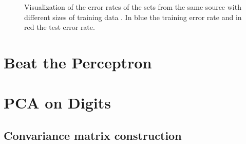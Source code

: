 \documentclass[12pt]{article}
\begin{document}
\begin{figure}[h!]
	\centering
	\hfill
	\hfill
	\hfill
	\caption[]{Visualization of the error rates of the  sets from the same source with different sizes of training data . In blue the training error rate and in red the test error rate. }
	\label{fig:2.1.surprise}
\end{figure}


\section{Beat the Perceptron}
 


\section{PCA on Digits}

\subsection{Convariance matrix construction}
\end{document}
